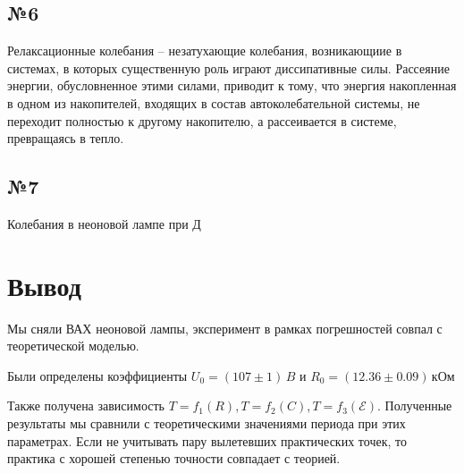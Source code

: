 \subsection{№6}

Релаксационные колебания -- незатухающие колебания, возникающиие в системах, в которых существенную роль играют диссипативные силы. Рассеяние энергии, обусловненное этими силами, приводит к тому, что энергия  накопленная в одном из накопителей, входящих в состав автоколебательной системы, не переходит полностью к другому накопителю, а рассеивается в системе, превращаясь в тепло.

\subsection{№7}
Колебания в неоновой лампе при Д

\newpage
\section{Вывод}
Мы сняли ВАХ неоновой лампы, эксперимент в рамках погрешностей совпал с теоретической моделью. 

Были определены коэффициенты $U_0=(107\pm 1)\,B$ и $R_0=(12.36\pm 0.09)\,\text{кОм}$

Также получена зависимость $T=f_1(R)$,\,$T=f_2(C)$,\,$T=f_3(\mathcal{E})$. 
Полученные результаты мы сравнили с теоретическими значениями периода при этих параметрах. Если не учитывать пару вылетевших практических точек, то практика с хорошей степенью точности совпадает с теорией. 


